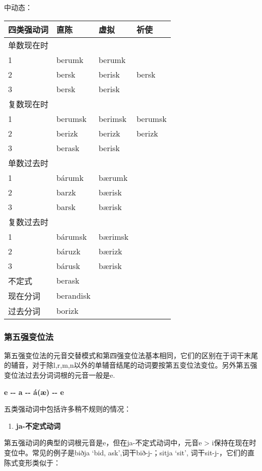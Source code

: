 中动态：

\begin{longtable}{llll}
\toprule
四类强动词 & 直陈 & 虚拟 & 祈使 \\
\midrule
\endhead
\bottomrule
\endfoot
单数现在时 & & & \\
1 & berumk & berumk & \\
2 & bersk & berisk & bersk \\
3 & bersk & berisk & \\
复数现在时 & & & \\
1 & berumsk & berimsk & berumsk \\
2 & berizk & berizk & berizk \\
3 & berask & berisk & \\
单数过去时 & & & \\
1 & bárumk & bærumk & \\
2 & barzk & bærisk & \\
3 & barsk & bærisk & \\
复数过去时 & & & \\
1 & bárumsk & bærimsk & \\
2 & báruzk & bærizk & \\
3 & bárusk & bærisk & \\
不定式 & berask & & \\
现在分词 & berandisk & & \\
过去分词 & borizk & & \\
\end{longtable}

\subsubsection{第五强变位法}\label{ux7b2cux4e94ux5f3aux53d8ux4f4dux6cd5}

第五强变位法的元音交替模式和第四强变位法基本相同，它们的区别在于词干末尾的辅音，对于除l,r,m,n以外的单辅音结尾的动词要按第五变位法变位。另外第五强变位法过去分词词根的元音一般是e.

\textbf{e -\/- a -\/- á(æ) -\/- e}

五类强动词中包括许多稍不规则的情况：

\begin{enumerate}
\def\labelenumi{\arabic{enumi})}
\item
  \textbf{ja-不定式动词}
\end{enumerate}

第五强动词的典型的词根元音是e，但在ja-不定式动词中，元音e \textgreater{}
i保持在现在时变位中。常见的例子是biðja `bid, ask‌',词干bið-j-；sitja
`sit‌', 词干sit-j-，它们的直陈式变形类似于：

